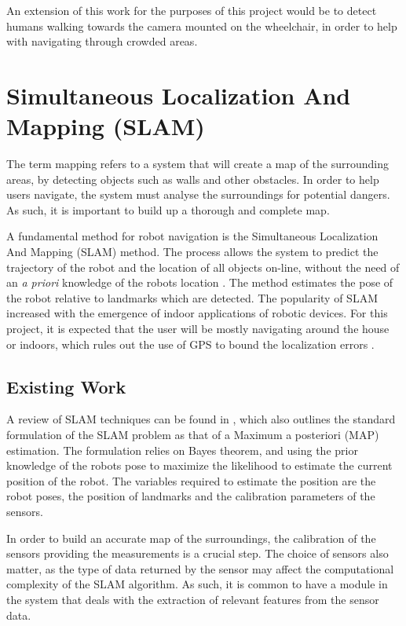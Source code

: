 \documentclass[12pt,a4paper]{report}
\begin{document}
An extension of this work for the purposes of this project would be to detect humans walking towards the camera mounted on the wheelchair, in order to help with navigating through crowded areas.


\section{Simultaneous Localization And Mapping (SLAM)}
The term mapping refers to a system that will create a map of the surrounding areas, by detecting objects such as walls and other obstacles. In order to help users navigate, the system must analyse the surroundings for potential dangers. As such, it is important to build up a thorough and complete map.

A fundamental method for robot navigation is the Simultaneous Localization And Mapping (SLAM) method. The process allows the system to predict the trajectory of the robot and the location of all objects on-line, without the need of an \textit{a priori} knowledge of the robots location \citep{Bailey2006a}. The method estimates the pose of the robot relative to landmarks which are detected. The popularity of SLAM increased with the emergence of indoor applications of robotic devices. For this project, it is expected that the user will be mostly navigating around the house or indoors, which rules out the use of GPS to bound the localization errors \citep{Cadena2016}.

\subsection{Existing Work}
A review of SLAM techniques can be found in \cite{Cadena2016}, which also outlines the standard formulation of the SLAM problem as that of a Maximum a posteriori (MAP) estimation. The formulation relies on Bayes theorem, and using the prior knowledge of the robots pose to maximize the likelihood to estimate the current position of the robot. The variables required to estimate the position are the robot poses, the position of landmarks and the calibration parameters of the sensors.

In order to build an accurate map of the surroundings, the calibration of the sensors providing the measurements is a crucial step. The choice of sensors also matter, as the type of data returned by the sensor may affect the computational complexity of the SLAM algorithm. As such, it is common to have a module in the system that deals with the extraction of relevant features from the sensor data.
\end{document}

